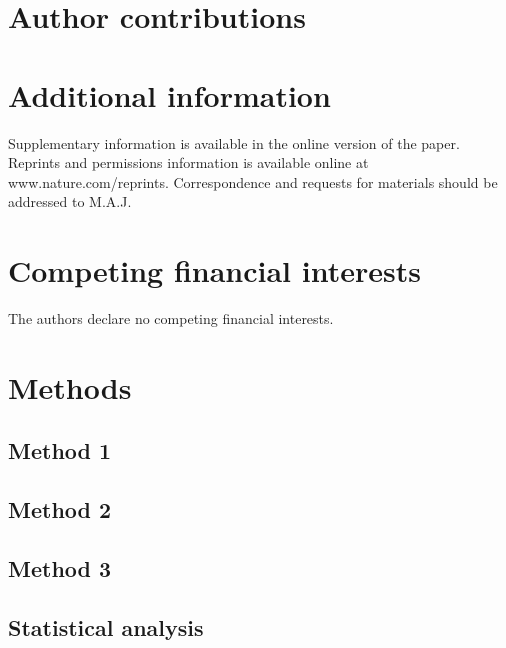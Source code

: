 \documentclass[twocolumn, linenumbers, superscriptaddress]{revtex4-1}
\begin{document}
	\section*{Author contributions}
		\blindtext
	
	\section*{Additional information}
		Supplementary information is available in the online version of the paper.
		Reprints and permissions information is available online at www.nature.com/reprints.
		Correspondence and requests for materials should be addressed to M.A.J.
	
	\section*{Competing financial interests}
		The authors declare no competing financial interests.
	
	\newpage

	\section*{Methods}
		\subsection*{Method 1}
			\blindtext[3]
			
		\subsection*{Method 2}
			\blindtext[3]
			
		\subsection*{Method 3}
			\blindtext[3]
			
		\subsection*{Statistical analysis}
			\blindtext[3]
			
\end{document}
